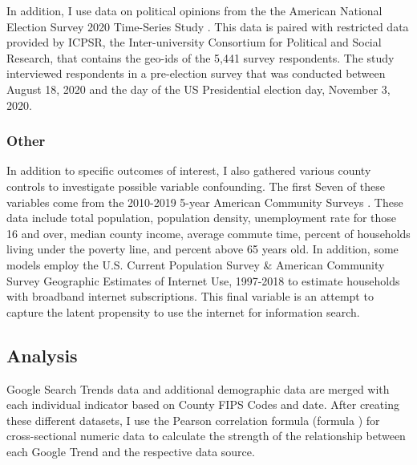 In addition, I use data on political opinions from the the American National
Election Survey 2020 Time-Series Study \citep{anes_data}. This data is paired with
restricted data provided by ICPSR, the Inter-university Consortium for Political
and Social Research, that contains the geo-ids of the 5,441
survey respondents. The study interviewed respondents in a pre-election survey
that was conducted between August 18, 2020 and the day of the US Presidential
election day, November 3, 2020.


\subsubsection{Other}

In addition to specific outcomes of interest, I also gathered various county
controls to investigate possible variable confounding. The first Seven of these
variables come from the 2010-2019 5-year American Community Surveys
\citep{acs2019, acs2018, acs2017, acs2016, acs2015, acs2014, acs2013, acs2012, acs2011, acs2010}. 
These data include total population, population density,
unemployment rate for those 16 and over, median county income, average commute
time, percent of households living under the poverty line, and percent above 65
years old. In addition, some models employ the U.S. Current Population Survey &
American Community Survey Geographic Estimates of Internet Use, 1997-2018
\citep{internet_use} to estimate households with broadband internet subscriptions.
This final variable is an attempt to capture the latent propensity to use the
internet for information search.


\subsection{Analysis}
Google Search Trends data and additional demographic data are merged with each
individual indicator based on County FIPS Codes and date. After creating these
different datasets, I use the Pearson correlation formula (formula
) for cross-sectional numeric data to calculate the
strength of the relationship between each Google Trend and the respective
data source.

